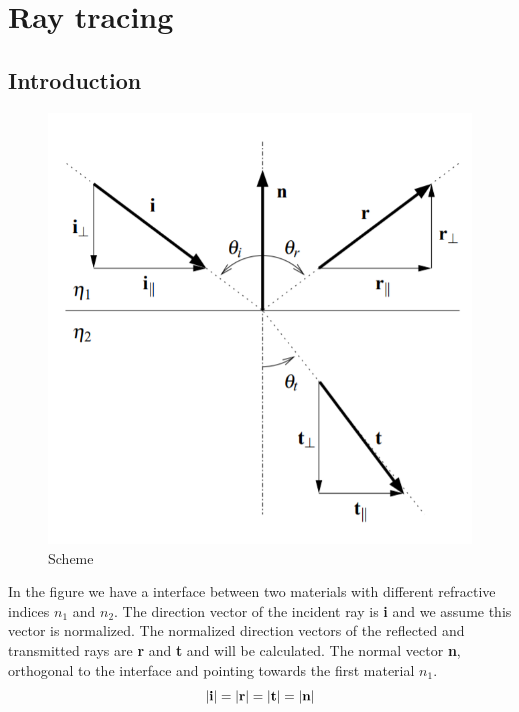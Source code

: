 \documentclass[../main.tex]{subfiles}
\begin{document}
	\section{Ray tracing}
	\subsection{Introduction}
	\begin{figure}[h!]
	  \centering
	  \includegraphics[scale=0.7]{../graphics/Ray_tracing1.png}
	  \caption{Scheme}
	  \label{fig:interface1}
	\end{figure}
	In the figure we have a interface between two materials with different refractive indices $n_1$ and $n_2$. The direction vector of the incident ray is \textbf{i} and we assume this vector is normalized. The normalized direction vectors of the reflected and transmitted rays are \textbf{r} and \textbf{t} and will be calculated. The normal vector \textbf{n}, orthogonal to the interface and pointing towards the first material $n_1$.
	\begin{equation}
	\left\lvert\textbf{i}\right\rvert=\left\lvert\textbf{r}\right\rvert=\left\lvert\textbf{t}\right\rvert=\left\lvert\textbf{n}\right\rvert
	\end{equation}
\end{document}

